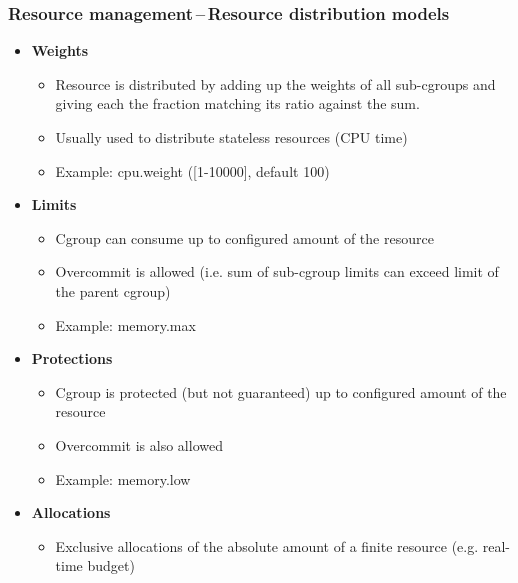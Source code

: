 \documentclass[serif]{beamer}
\begin{document}
\begin{frame}
  \frametitle{Resource management\,--\,Resource distribution models}

  \begin{itemize}
  \item \textbf{Weights}
    \begin{itemize}
    \item Resource is distributed by adding up the weights of all sub-cgroups and giving each the fraction matching its ratio against the sum.
    \item Usually used to distribute stateless resources (CPU time)
    \item Example: cpu.weight ([1-10000], default 100)
    \end{itemize}
    \pause

  \item \textbf{Limits}
    \begin{itemize}
    \item Cgroup can consume up to configured amount of the resource
    \item Overcommit is allowed (i.e. sum of sub-cgroup limits can exceed limit of the parent cgroup)
    \item Example: memory.max
    \end{itemize}
    \pause

  \item \textbf{Protections}
    \begin{itemize}
    \item Cgroup is protected (but not guaranteed) up to configured amount of the resource
    \item Overcommit is also allowed
    \item Example: memory.low
    \end{itemize}
    \pause

  \item \textbf{Allocations}
    \begin{itemize}
    \item Exclusive allocations of the absolute amount of a finite resource (e.g. real-time budget)
    \end{itemize}
  \end{itemize}
\end{frame}
\end{document}
